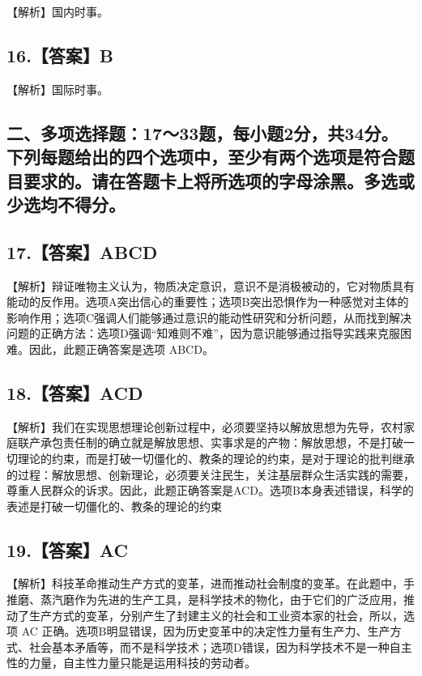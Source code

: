 \documentclass[UTF8,11pt]{ctexart}
\begin{document}
【解析】国内时事。


\subsection*{16.【答案】B}

【解析】国际时事。


\subsection*{二、多项选择题：17～33题，每小题2分，共34分。下列每题给出的四个选项中，至少有两个选项是符合题目要求的。请在答题卡上将所选项的字母涂黑。多选或少选均不得分。}

\subsection*{17.【答案】ABCD}

【解析】辩证唯物主义认为，物质决定意识，意识不是消极被动的，它对物质具有能动的反作用。选项A突出信心的重要性；选项B突出恐惧作为一种感觉对主体的影响作用；选项C强调人们能够通过意识的能动性研究和分析问题，从而找到解决问题的正确方法：选项D强调“知难则不难”，因为意识能够通过指导实践来克服困难。因此，此题正确答案是选项 ABCD。


\subsection*{18.【答案】ACD}

【解析】我们在实现思想理论创新过程中，必须要坚持以解放思想为先导，农村家庭联产承包责任制的确立就是解放思想、实事求是的产物：解放思想，不是打破一切理论的约束，而是打破一切僵化的、教条的理论的约束，是对于理论的批判继承的过程：解放思想、创新理论，必须要关注民生，关注基层群众生活实践的需要，尊重人民群众的诉求。因此，此题正确答案是ACD。选项B本身表述错误，科学的表述是打破一切僵化的、教条的理论的约束


\subsection*{19.【答案】AC}

【解析】科技革命推动生产方式的变革，进而推动社会制度的变革。在此题中，手推磨、蒸汽磨作为先进的生产工具，是科学技术的物化，由于它们的广泛应用，推动了生产方式的变革，分别产生了封建主义的社会和工业资本家的社会，所以，选项 AC 正确。选项B明显错误，因为历史变革中的决定性力量有生产力、生产方式、社会基本矛盾等，而不是科学技术；选项D错误，因为科学技术不是一种自主性的力量，自主性力量只能是运用科技的劳动者。
\end{document}
